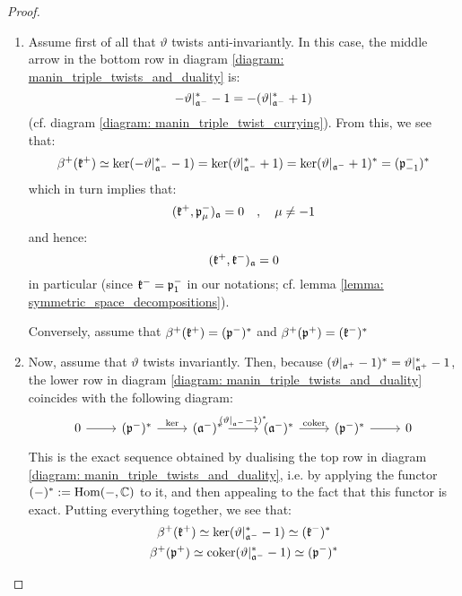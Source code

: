 \begin{proof}
                \begin{enumerate}
                    \item Assume first of all that $\vartheta$ twists anti-invariantly. In this case, the middle arrow in the bottom row in diagram \eqref{diagram: manin_triple_twists_and_duality} is:
                        $$-\vartheta|_{\mathfrak{a}^-}^* - 1 = -( \vartheta|_{\mathfrak{a}^-}^* + 1 )$$
                    (cf. diagram \eqref{diagram: manin_triple_twist_currying}). From this, we see that:
                        $$\beta^+(\mathfrak{k}^+) \simeq \ker(-\vartheta|_{\mathfrak{a}^-}^* - 1) = \ker(\vartheta|_{\mathfrak{a}^-}^* + 1) = \ker(\vartheta|_{\mathfrak{a}^-} + 1)^* = (\mathfrak{p}_{-1}^-)^*$$
                    which in turn implies that:
                        $$( \mathfrak{k}^+, \mathfrak{p}_{\mu}^- )_{\mathfrak{a}} = 0 \quad, \quad \mu \not = -1$$
                    and hence:
                        $$(\mathfrak{k}^+, \mathfrak{k}^-)_{\mathfrak{a}} = 0$$
                    in particular (since $\mathfrak{k}^- = \mathfrak{p}_1^-$ in our notations; cf. lemma \ref{lemma: symmetric_space_decompositions}).

                    Conversely, assume that $\beta^+(\mathfrak{k}^+) = (\mathfrak{p}^-)^*$ and $\beta^+(\mathfrak{p}^+) = (\mathfrak{k}^-)^*$
                    \item Now, assume that $\vartheta$ twists invariantly. Then, because $(\vartheta|_{\mathfrak{a}^+} - 1)^* = \vartheta|_{\mathfrak{a}^+}^* - 1$, the lower row in diagram \eqref{diagram: manin_triple_twists_and_duality} coincides with the following diagram:
                        \begin{equation}
                            \begin{tikzcd}
                            	0 & {(\p^-)^*} & {(\a^-)^*} & {(\a^-)^*} & {(\p^-)^*} & 0
                            	\arrow[from=1-1, to=1-2]
                            	\arrow["\ker", from=1-2, to=1-3]
                            	\arrow["{(\vartheta|_{\a^-} - 1)^*}", from=1-3, to=1-4]
                            	\arrow["\coker", from=1-4, to=1-5]
                            	\arrow[from=1-5, to=1-6]
                            \end{tikzcd}
                        \end{equation}
                    This is the exact sequence obtained by dualising the top row in diagram \eqref{diagram: manin_triple_twists_and_duality}, i.e. by applying the functor $(-)^* := \operatorname{Hom}(-, \mathbb{C})$ to it, and then appealing to the fact that this functor is exact. Putting everything together, we see that:
                        $$
                            \begin{gathered}
                                \beta^+(\mathfrak{k}^+) \simeq \ker(\vartheta|_{\mathfrak{a}^-}^* - 1) \simeq (\mathfrak{k}^-)^*
                                \\
                                \beta^+(\mathfrak{p}^+) \simeq \operatorname{coker}(\vartheta|_{\mathfrak{a}^-}^* - 1) \simeq (\mathfrak{p}^-)^*
                            \end{gathered}
                        $$
                        

\end{enumerate}
\end{proof}
